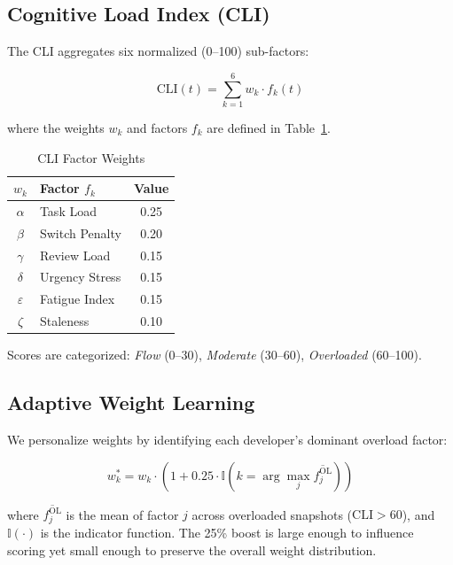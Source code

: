\documentclass[conference]{IEEEtran}
\begin{document}
\subsection{Cognitive Load Index (CLI)}

The CLI aggregates six normalized (0--100) sub-factors:

\begin{equation}
\text{CLI}(t) = \sum_{k=1}^{6} w_k \cdot f_k(t)
\label{eq:cli}
\end{equation}

where the weights $w_k$ and factors $f_k$ are defined in Table~\ref{tab:weights}.

\begin{table}[t]
\centering
\caption{CLI Factor Weights}
\label{tab:weights}
\begin{tabular}{@{}clc@{}}
\toprule
$w_k$ & \textbf{Factor $f_k$} & \textbf{Value} \\
\midrule
$\alpha$ & Task Load & 0.25 \\
$\beta$ & Switch Penalty & 0.20 \\
$\gamma$ & Review Load & 0.15 \\
$\delta$ & Urgency Stress & 0.15 \\
$\varepsilon$ & Fatigue Index & 0.15 \\
$\zeta$ & Staleness & 0.10 \\
\bottomrule
\end{tabular}
\end{table}

Scores are categorized: \emph{Flow} (0--30), \emph{Moderate} (30--60), \emph{Overloaded} (60--100).

\subsection{Adaptive Weight Learning}

We personalize weights by identifying each developer's dominant overload factor:

\begin{equation}
w_k^* = w_k \cdot \left(1 + 0.25 \cdot \mathbb{I}\!\left(k = \arg\max_j \overline{f_j^{\text{OL}}}\right)\right)
\label{eq:adapt}
\end{equation}

where $\overline{f_j^{\text{OL}}}$ is the mean of factor $j$ across overloaded snapshots ($\text{CLI} > 60$), and $\mathbb{I}(\cdot)$ is the indicator function. The 25\% boost is large enough to influence scoring yet small enough to preserve the overall weight distribution.
\end{document}
